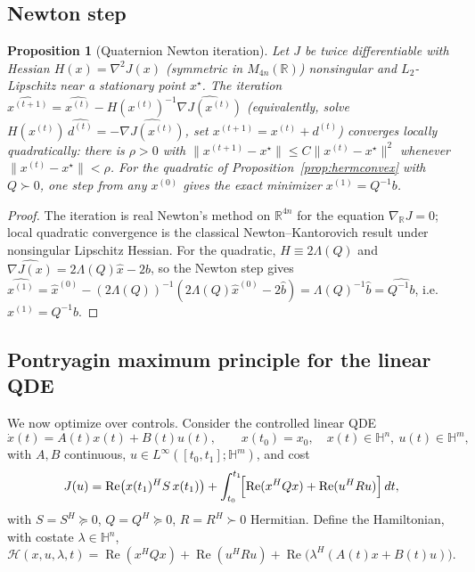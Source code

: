 \documentclass{amsart}
\newtheorem{proposition}[theorem]{Proposition}
\theoremstyle{definition}
\newcommand{\HH}{\mathbb{H}}
\newcommand{\RR}{\mathbb{R}}
\newcommand{\Real}{\operatorname{Re}}
\begin{document}
\subsection{Newton step}
\begin{proposition}[Quaternion Newton iteration]
\label{prop:newton}
Let $J$ be twice differentiable with Hessian $H(x)=\nabla^2J(x)$
\textup{(}symmetric in $M_{4n}(\RR)$\textup{)} nonsingular and
$L_2$-Lipschitz near a stationary point $x^\star$. The iteration
$\widehat{x^{(t+1)}}=\widehat{x^{(t)}}-H(x^{(t)})^{-1}
\widehat{\nabla J(x^{(t)})}$ \textup{(}equivalently, solve
$H(x^{(t)})\,\widehat{d^{(t)}}=-\widehat{\nabla J(x^{(t)})}$, set
$x^{(t+1)}=x^{(t)}+d^{(t)}$\textup{)} converges locally
quadratically: there is $\rho>0$ with
$\|x^{(t+1)}-x^\star\|\le C\|x^{(t)}-x^\star\|^2$ whenever
$\|x^{(t)}-x^\star\|<\rho$. For the quadratic of
Proposition~\ref{prop:hermconvex} with $Q\succ0$, one step from any
$x^{(0)}$ gives the exact minimizer $x^{(1)}=Q^{-1}b$.
\end{proposition}

\begin{proof}
The iteration is real Newton's method on $\RR^{4n}$ for the equation
$\nabla_\RR J=0$; local quadratic convergence is the classical
Newton–Kantorovich result under nonsingular Lipschitz Hessian. For the
quadratic, $H\equiv2\Lambda(Q)$ and
$\widehat{\nabla J(x)}=2\Lambda(Q)\widehat x-2\widehat b$, so the Newton
step gives
$\widehat{x^{(1)}}=\widehat x^{(0)}-(2\Lambda(Q))^{-1}
(2\Lambda(Q)\widehat x^{(0)}-2\widehat b)
=\Lambda(Q)^{-1}\widehat b=\widehat{Q^{-1}b}$, i.e.
$x^{(1)}=Q^{-1}b$.
\end{proof}

\subsection{Pontryagin maximum principle for the linear QDE}
We now optimize over controls. Consider the controlled linear QDE
\begin{equation}\label{eq:control}
\dot x(t)=A(t)x(t)+B(t)u(t),\qquad x(t_0)=x_0,\quad
x(t)\in\HH^n,\ u(t)\in\HH^m,
\end{equation}
with $A,B$ continuous, $u\in L^\infty([t_0,t_1];\HH^m)$, and cost
\begin{equation}\label{eq:cost}
J(u)=\Real\bigl(x(t_1)^H S\,x(t_1)\bigr)
+\int_{t_0}^{t_1}\!\Bigl[\Real(x^H Q x)+\Real(u^H R u)\Bigr]\,dt,
\end{equation}
with $S=S^H\succeq0$, $Q=Q^H\succeq0$, $R=R^H\succ0$ Hermitian. Define
the Hamiltonian, with costate $\lambda\in\HH^n$,
\begin{equation}\label{eq:ham}
\mathcal H(x,u,\lambda,t)
=\Real(x^H Q x)+\Real(u^H R u)
+\Real\!\bigl(\lambda^H(A(t)x+B(t)u)\bigr).
\end{equation}
\end{document}
